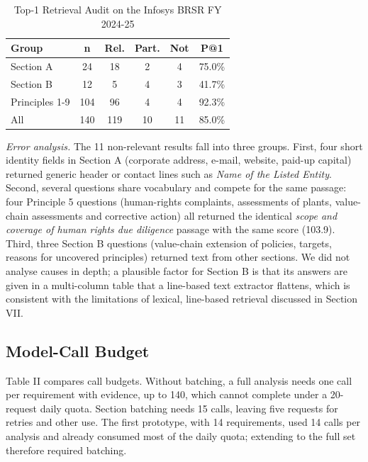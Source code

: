 \documentclass[conference]{IEEEtran}
\begin{document}
\begin{table}[!t]\centering\caption{Top-1 Retrieval Audit on the Infosys BRSR FY 2024-25}
\footnotesize\begin{tabular}{lccccc}\toprule
Group & n & Rel. & Part. & Not & P@1 \\ \midrule
Section A & 24 & 18 & 2 & 4 & 75.0\% \\
Section B & 12 & 5 & 4 & 3 & 41.7\% \\
Principles 1-9 & 104 & 96 & 4 & 4 & 92.3\% \\
All & 140 & 119 & 10 & 11 & 85.0\% \\
\bottomrule\end{tabular}
\par{}
\end{table}
\textit{Error analysis.} The 11 non-relevant results fall into three groups. First, four short identity fields in Section A (corporate address, e-mail, website, paid-up capital) returned generic header or contact lines such as \textit{Name of the Listed Entity}. Second, several questions share vocabulary and compete for the same passage: four Principle 5 questions (human-rights complaints, assessments of plants, value-chain assessments and corrective action) all returned the identical \textit{scope and coverage of human rights due diligence} passage with the same score (103.9). Third, three Section B questions (value-chain extension of policies, targets, reasons for uncovered principles) returned text from other sections. We did not analyse causes in depth; a plausible factor for Section B is that its answers are given in a multi-column table that a line-based text extractor flattens, which is consistent with the limitations of lexical, line-based retrieval discussed in Section VII.

\subsection{Model-Call Budget}
Table II compares call budgets. Without batching, a full analysis needs one call per requirement with evidence, up to 140, which cannot complete under a 20-request daily quota. Section batching needs 15 calls, leaving five requests for retries and other use. The first prototype, with 14 requirements, used 14 calls per analysis and already consumed most of the daily quota; extending to the full set therefore required batching.
\end{document}
